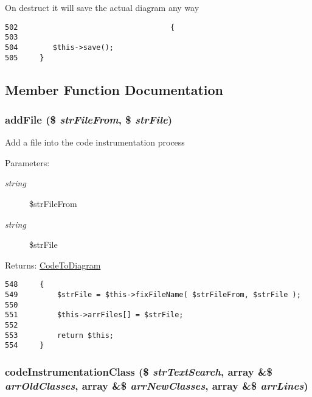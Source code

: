 On destruct it will save the actual diagram any way 

\begin{Code}\begin{verbatim}502                                   {
503 
504        $this->save();
505     }
\end{verbatim}
\end{Code}




\subsection{Member Function Documentation}
\hypertarget{class_code_to_diagram_5ddaedacfee2008cacee41a47363e7fa}{
\subsubsection[{addFile}]{\setlength{\rightskip}{0pt plus 5cm}addFile (\$ {\em strFileFrom}, \/  \$ {\em strFile})}}
\label{class_code_to_diagram_5ddaedacfee2008cacee41a47363e7fa}


Add a file into the code instrumentation process

\begin{Desc}
\item[Parameters:]
\begin{description}
\item[{\em string}]\$strFileFrom \item[{\em string}]\$strFile \end{description}
\end{Desc}
\begin{Desc}
\item[Returns:]\hyperlink{class_code_to_diagram}{CodeToDiagram} \end{Desc}


\begin{Code}\begin{verbatim}548     {
549         $strFile = $this->fixFileName( $strFileFrom, $strFile );
550 
551         $this->arrFiles[] = $strFile;
552 
553         return $this;
554     }
\end{verbatim}
\end{Code}


\hypertarget{class_code_to_diagram_ec172f2211fc097efa89f3546c0bd308}{
\subsubsection[{codeInstrumentationClass}]{\setlength{\rightskip}{0pt plus 5cm}codeInstrumentationClass (\$ {\em strTextSearch}, \/  array \&\$ {\em arrOldClasses}, \/  array \&\$ {\em arrNewClasses}, \/  array \&\$ {\em arrLines})}}
\label{class_code_to_diagram_ec172f2211fc097efa89f3546c0bd308}


